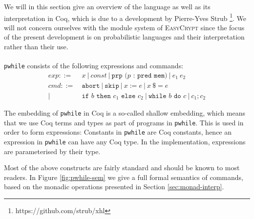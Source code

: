 \documentclass[11pt, leqno, titlepage]{article}
\theoremstyle{definition}
\begin{document}
We will in this section give an overview of the language as well as its
interpretation in Coq, which is due to a development by Pierre-Yves Strub
\footnote{https://github.com/strub/xhl}. We will not concern ourselves with the
module system of \textsc{EasyCrypt} since the focus of the present development is
on probabilistic languages and their interpretation rather than their use.\\
\\
\texttt{pwhile} consists of the following expressions and commands: 
\begin{align*}
  exp ::=~& x ~\vert ~ const ~\vert ~ \texttt{prp ($p$ : pred mem)}~\vert ~ e_1\ e_2\\
  cmd ::=~& \texttt{abort} ~\vert ~ \texttt{skip} ~\vert ~ x := e ~\vert ~ x\ \$= e\\
  \vert ~ & \texttt{if } b \texttt{ then } c_1 \texttt{ else } c_2 ~\vert ~
            \texttt{while } b \texttt{ do } c ~\vert ~ c_1 ; c_2
\end{align*}

The embedding of \texttt{pwhile} in Coq is a so-called shallow embedding, which means
that we use Coq terms and types as part of programs in \texttt{pwhile}. This is used
in order to form expressions: Constants in \texttt{pwhile} are Coq constants, hence
an expression in \texttt{pwhile} can have any Coq type. In the implementation,
expressions are parameterised by their type.

Most of the above constructs are fairly standard and should be known to most
readers. In Figure \ref{fig:pwhile-sem} we give a full formal semantics of commands,
based on the monadic operations presented in Section \ref{sec:monad-interp}.
\end{document}
